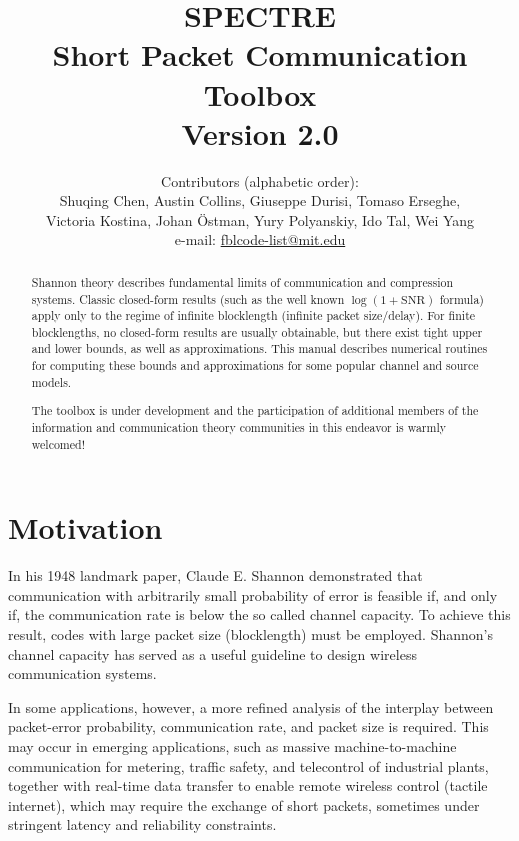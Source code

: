 \documentclass[a4paper,11p]{memoir}
\begin{document}
\title{SPECTRE\\
Short Packet Communication Toolbox\\[1cm]
Version 2.0}

\author{Contributors (alphabetic order):\\
Shuqing Chen, Austin Collins, Giuseppe Durisi, Tomaso Erseghe, \\Victoria Kostina, Johan \"Ostman, Yury Polyanskiy, Ido Tal, Wei Yang\\[10pt]
e-mail: \url{fblcode-list@mit.edu}}




\maketitle

\begin{abstract}

Shannon theory describes fundamental limits of communication and
compression systems. Classic closed-form results
(such as the well known $\log(1+\mathrm{SNR})$ formula)   apply only to the regime of infinite blocklength
(infinite packet size/delay). For finite blocklengths, no closed-form results are usually
obtainable, but there  exist tight upper and lower bounds, as well as
approximations. This manual describes numerical routines for  computing
these bounds and approximations for some popular channel and
source models.

The toolbox is under development and the participation of additional
members of the information and communication theory communities in
this endeavor is warmly welcomed!
\end{abstract}
\newpage
\tableofcontents

\newpage
\chapter{Motivation}
%
  In his 1948 landmark paper, Claude E. Shannon demonstrated that communication with arbitrarily small probability of error is feasible if, and only if, the communication rate is below the so called channel capacity. 
  To achieve this result, codes with large packet size (blocklength) must be employed. 
 Shannon's channel capacity has served as a useful guideline to design wireless communication systems.

In some applications, however, a more refined analysis of the interplay between packet-error probability, communication rate, and packet size is required.
  This may occur in emerging applications, such as massive machine-to-machine communication for metering, traffic safety, and telecontrol of industrial plants, together with real-time data transfer to enable remote wireless control (tactile internet), which may require the exchange of short packets, sometimes under stringent latency and reliability constraints.
  
\end{document}
